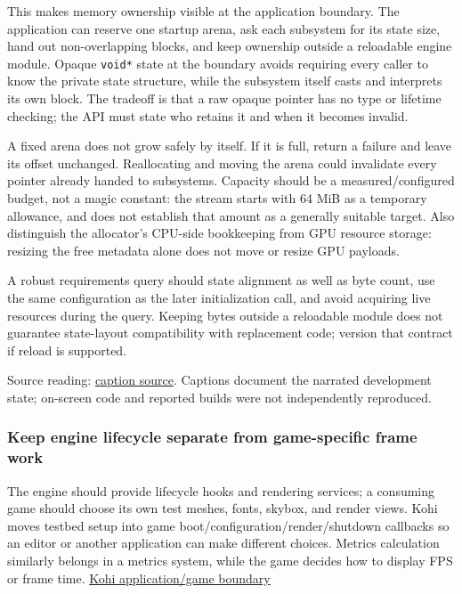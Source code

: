 This makes memory ownership visible at the application boundary. The application can reserve one startup arena, ask each subsystem for its state size, hand out non-overlapping blocks, and keep ownership outside a reloadable engine module. Opaque \texttt{void*} state at the boundary avoids requiring every caller to know the private state structure, while the subsystem itself casts and interprets its own block. The tradeoff is that a raw opaque pointer has no type or lifetime checking; the API must state who retains it and when it becomes invalid.

A fixed arena does not grow safely by itself. If it is full, return a failure and leave its offset unchanged. Reallocating and moving the arena could invalidate every pointer already handed to subsystems. Capacity should be a measured/configured budget, not a magic constant: the stream starts with 64 MiB as a temporary allowance, and does not establish that amount as a generally suitable target. Also distinguish the allocator's CPU-side bookkeeping from GPU resource storage: resizing the free metadata alone does not move or resize GPU payloads.

A robust requirements query should state alignment as well as byte count, use the same configuration as the later initialization call, and avoid acquiring live resources during the query. Keeping bytes outside a reloadable module does not guarantee state-layout compatibility with replacement code; version that contract if reload is supported.

Source reading: \href{https://www.youtube.com/watch?v=3ZFcvBjRFN0}{caption source}. Captions document the narrated development state; on-screen code and reported builds were not independently reproduced.

\subsubsection{Keep engine lifecycle separate from game-specific frame work}\label{05-engine-i-ch013-keep-engine-lifecycle-separate-from-game-specific-frame-work}

The engine should provide lifecycle hooks and rendering services; a consuming game should choose its own test meshes, fonts, skybox, and render views. Kohi moves testbed setup into game boot/configuration/render/shutdown callbacks so an editor or another application can make different choices. Metrics calculation similarly belongs in a metrics system, while the game decides how to display FPS or frame time. \href{https://www.youtube.com/watch?v=UWaUUhOFCec}{Kohi application/game boundary}

